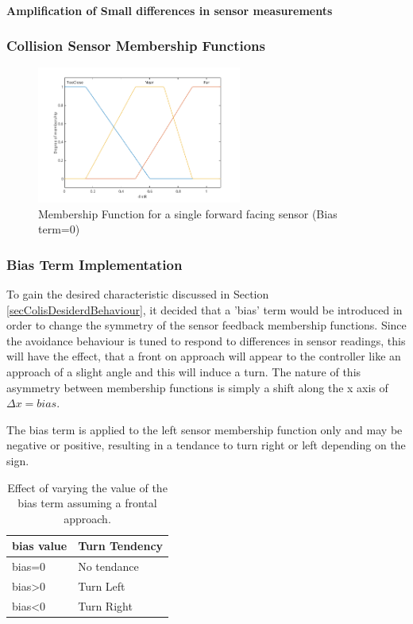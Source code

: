 \documentclass[11pt]{article}
\numberwithin{equation}{section}
\begin{document}
\paragraph{Amplification of Small differences in sensor measurements}
\label{sec:orgbbfb9c2}


\subsubsection{Collision Sensor Membership Functions}
\label{sec:org01d8b2a}

\begin{figure}[H]
\centering
\includegraphics[width=0.6\textwidth]{Section3/Figures/FinalFigures/MembershipFuntionSensor.png}
\caption{\label{figMembershipFunctionFwdSensor}Membership Function for a single forward facing sensor (Bias term=0)}
\end{figure}

\subsubsection{Bias Term Implementation}
\label{sec:org9dbb5e8}
To gain the desired characteristic discussed in Section \ref{secColisDesiderdBehaviour}, it decided that a 'bias' term would be introduced in order to change the symmetry of the sensor feedback membership functions. Since the avoidance behaviour is tuned to respond to differences in sensor readings, this will have the effect, that a front on approach will appear to the controller like an approach of a slight angle and this will induce a turn. The nature of this asymmetry between membership functions is simply a shift along the x axis of \(\Delta x = bias\).

The bias term is applied to the left sensor membership function only and may be negative or positive, resulting in a tendance to turn right or left depending on the sign.

\begin{table}[H]
\caption{\label{tabBiasTermEffect}Effect of varying the value of the bias term assuming a frontal approach.}
\centering
\begin{tabular}{ll}
\toprule
bias value & Turn Tendency\\
\midrule
bias=0 & No tendance\\
bias>0 & Turn Left\\
bias<0 & Turn Right\\
\bottomrule
\end{tabular}
\end{table}
\end{document}
